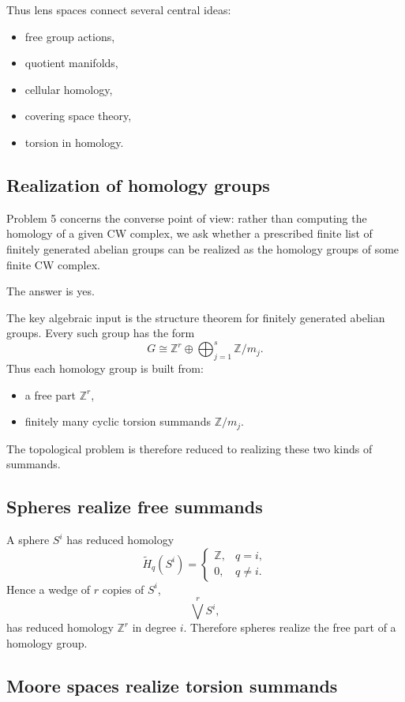 \documentclass[12pt,a4paper]{article}
\theoremstyle{notespace}
\begin{document}
Thus lens spaces connect several central ideas:
\begin{itemize}
	\item free group actions,
	\item quotient manifolds,
	\item cellular homology,
	\item covering space theory,
	\item torsion in homology.
\end{itemize}

\subsection{Realization of homology groups}

Problem 5 concerns the converse point of view: rather than computing the homology of a given CW complex, we ask whether a prescribed finite list of finitely generated abelian groups can be realized as the homology groups of some finite CW complex.

The answer is yes.

The key algebraic input is the structure theorem for finitely generated abelian groups. Every such group has the form
\[
G \cong \mathbb Z^r \oplus \bigoplus_{j=1}^s \mathbb Z/m_j.
\]
Thus each homology group is built from:
\begin{itemize}
	\item a free part \(\mathbb Z^r\),
	\item finitely many cyclic torsion summands \(\mathbb Z/m_j\).
\end{itemize}

The topological problem is therefore reduced to realizing these two kinds of summands.

\subsection{Spheres realize free summands}

A sphere \(S^i\) has reduced homology
\[
\widetilde H_q(S^i)=
\begin{cases}
	\mathbb Z, & q=i,\\
	0, & q\neq i.
\end{cases}
\]
Hence a wedge of \(r\) copies of \(S^i\),
\[
\bigvee^r S^i,
\]
has reduced homology \(\mathbb Z^r\) in degree \(i\). Therefore spheres realize the free part of a homology group.

\subsection{Moore spaces realize torsion summands}
\end{document}
